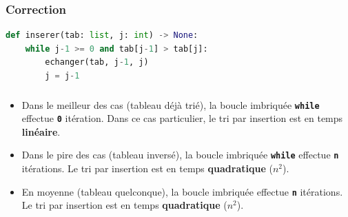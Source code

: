 \documentclass[svgnames,11pt]{beamer}
\begin{document}
\begin{frame}[fragile]
    \frametitle{Correction}

\begin{center}
\begin{lstlisting}[language=Python , basicstyle=\ttfamily\small, xleftmargin=2em, xrightmargin=0em]
def inserer(tab: list, j: int) -> None:
    while j-1 >= 0 and tab[j-1] > tab[j]:
        echanger(tab, j-1, j)
        j = j-1
\end{lstlisting}
\end{center}
    \begin{center}
        \label{CODE}
        \end{center}

\end{frame}
\begin{frame}
    \frametitle{}

    \begin{aretenir}[]
    \begin{itemize}
        \item<1-> Dans le meilleur des cas (tableau déjà trié), la boucle imbriquée \textbf{\texttt{while}} effectue \textbf{\texttt{0}} itération. Dans ce cas particulier, le tri par insertion est en temps \textbf{linéaire}.
        \item<2-> Dans le pire des cas (tableau inversé), la boucle imbriquée \textbf{\texttt{while}} effectue \textbf{\texttt{n}} itérations. Le tri par insertion est en temps \textbf{quadratique} ($n^2$).
        \item<3-> En moyenne (tableau quelconque), la boucle imbriquée effectue \textbf{\texttt{n}} itérations. Le tri par insertion est en temps \textbf{quadratique} ($n^2$).
    \end{itemize}
    \end{aretenir}

\end{frame}
\end{document}
